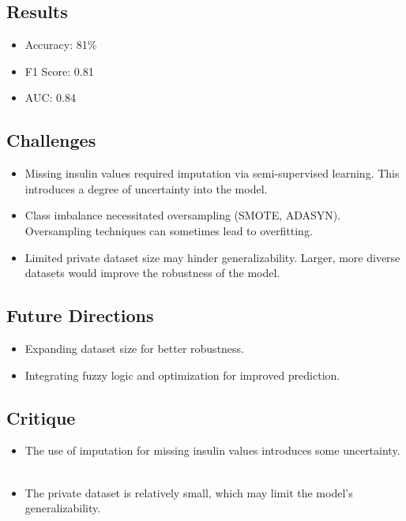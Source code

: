 \subsection*{Results}
\begin{itemize}
    \item Accuracy: 81\%
    \item F1 Score: 0.81
    \item AUC: 0.84
\end{itemize}

\subsection*{Challenges}
\begin{itemize}
    \item Missing insulin values required imputation via semi-supervised learning. This introduces a degree of uncertainty into the model.
    \item Class imbalance necessitated oversampling (SMOTE, ADASYN). Oversampling techniques can sometimes lead to overfitting.
    \item Limited private dataset size may hinder generalizability. Larger, more diverse datasets would improve the robustness of the model.
\end{itemize}

\subsection*{Future Directions}
\begin{itemize}
    \item Expanding dataset size for better robustness.
    \item Integrating fuzzy logic and optimization for improved prediction.
\end{itemize}

\subsection*{Critique}
\begin{itemize}
    \item The use of imputation for missing insulin values introduces some uncertainty.    
    \item The private dataset is relatively small, which may limit the model's generalizability.    
\end{itemize}

